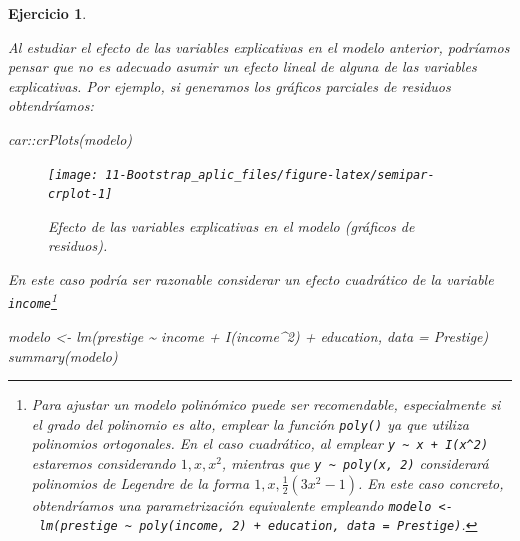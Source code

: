 \documentclass[
]{book}
\newenvironment{Shaded}{\begin{snugshade}}{\end{snugshade}}
\newcommand{\AttributeTok}[1]{\textcolor[rgb]{0.77,0.63,0.00}{#1}}
\newcommand{\DecValTok}[1]{\textcolor[rgb]{0.00,0.00,0.81}{#1}}
\newcommand{\FunctionTok}[1]{\textcolor[rgb]{0.00,0.00,0.00}{#1}}
\newcommand{\NormalTok}[1]{#1}
\newcommand{\OtherTok}[1]{\textcolor[rgb]{0.56,0.35,0.01}{#1}}
\newcommand{\SpecialCharTok}[1]{\textcolor[rgb]{0.00,0.00,0.00}{#1}}
\theoremstyle{break}
\newtheorem{exercise}{Ejercicio}[chapter]
\theoremstyle{nonumberplain}
\begin{document}
\begin{exercise}
\protect\hypertarget{exr:test-semipar-cuadratico}{}\label{exr:test-semipar-cuadratico}

Al estudiar el efecto de las variables explicativas en el modelo
anterior, podríamos pensar que no es adecuado asumir un efecto lineal
de alguna de las variables explicativas. Por ejemplo, si generamos los gráficos
parciales de residuos obtendríamos:

\begin{Shaded}
\begin{Highlighting}[]
\NormalTok{car}\SpecialCharTok{::}\FunctionTok{crPlots}\NormalTok{(modelo)}
\end{Highlighting}
\end{Shaded}

\begin{figure}[!htb]

{\centering \texttt{[image: 11-Bootstrap\_aplic\_files/figure-latex/semipar-crplot-1]} 

}

\caption{Efecto de las variables explicativas en el modelo (gráficos de residuos).}\label{fig:semipar-crplot}
\end{figure}

En este caso podría ser razonable considerar un efecto cuadrático
de la variable \texttt{income}\footnote{Para ajustar un modelo polinómico
  puede ser recomendable, especialmente si el grado del polinomio es alto,
  emplear la función \texttt{poly()} ya que utiliza polinomios ortogonales.
  En el caso cuadrático, al emplear \texttt{y\ \textasciitilde{}\ x\ +\ I(x\^{}2)}
  estaremos considerando \(1, x, x^2\), mientras que \texttt{y\ \textasciitilde{}\ poly(x,\ 2)} considerará
  polinomios de Legendre de la forma \(1, x, \frac{1}{2}(3x^2-1)\).
  En este caso concreto, obtendríamos una parametrización equivalente
  empleando \texttt{modelo\ \textless{}-\ lm(prestige\ \textasciitilde{}\ poly(income,\ 2)\ +\ education,\ data\ =\ Prestige)}.}

\begin{Shaded}
\begin{Highlighting}[]
\NormalTok{modelo }\OtherTok{\textless{}{-}} \FunctionTok{lm}\NormalTok{(prestige }\SpecialCharTok{\textasciitilde{}}\NormalTok{ income }\SpecialCharTok{+} \FunctionTok{I}\NormalTok{(income}\SpecialCharTok{\^{}}\DecValTok{2}\NormalTok{) }\SpecialCharTok{+}\NormalTok{ education, }\AttributeTok{data =}\NormalTok{ Prestige)}
\FunctionTok{summary}\NormalTok{(modelo)}
\end{Highlighting}
\end{Shaded}


\end{exercise}
\end{document}

